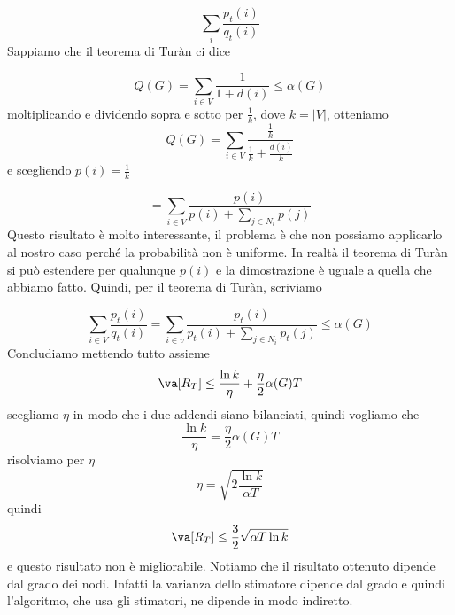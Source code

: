 \documentclass[12pt]{report}
\begin{document}
$$\sum_i \frac{p_t(i)}{q_t(i)}$$
Sappiamo che il teorema di Turàn ci dice

$$Q(G) = \sum_{i \in V} \frac{1}{1 + d(i)} \leq \alpha(G)$$
moltiplicando e dividendo sopra e sotto per $\frac{1}{k}$, dove $k = |V|$, otteniamo
$$Q(G) = \sum_{i \in V} \frac{\frac{1}{k}}{\frac{1}{k} + \frac{d(i)}{k}}$$
e scegliendo $p(i) = \frac{1}{k}$

$$= \sum_{i \in V} \frac{p(i)}{p(i) + \sum_{j \in N_i}p(j)}$$
Questo risultato è molto interessante, il problema è che non possiamo applicarlo al nostro caso perché la probabilità non è uniforme. In realtà il teorema di Turàn si può estendere per qualunque $p(i)$ e la dimostrazione è uguale a quella che abbiamo fatto. Quindi, per il teorema di Turàn, scriviamo

$$\sum_{i \in V} \frac{p_t(i)}{q_t(i)} = \sum_{i \in v} \frac{p_t(i)}{p_t(i) + \sum_{j \in N_i} p_t(j)} \leq \alpha(G)$$
Concludiamo mettendo tutto assieme
$$\va[R_T] \leq \frac{\ln{k}}{\eta} + \frac{\eta}{2} \alpha(G) T$$
scegliamo $\eta$ in modo che i due addendi siano bilanciati, quindi vogliamo che
$$\frac{\ln{k}}{\eta} = \frac{\eta}{2} \alpha(G) T$$
risolviamo per $\eta$
$$\eta = \sqrt{2 \frac{\ln{k}}{\alpha T}}$$
quindi
$$\va[R_T] \leq \frac{3}{2} \sqrt{\alpha T \ln{k}}$$
e questo risultato non è migliorabile. Notiamo che il risultato ottenuto dipende dal grado dei nodi. Infatti la varianza dello stimatore dipende dal grado e quindi l'algoritmo, che usa gli stimatori, ne dipende in modo indiretto.
\end{document}
